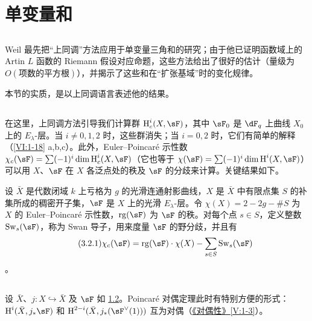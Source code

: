 \section{单变量和}\label{VI:3}

\subsection{}\label{VI:3-1}

Weil 最先把“上同调”方法应用于单变量三角和的研究；由于他已证明函数域上的 Artin $L$ 函数的 Riemann 假设对应命题，这些方法给出了很好的估计（量级为 $O(\text{项数的平方根})$），并揭示了这些和在“扩张基域”时的变化规律。

本节的实质，是以上同调语言表述他的结果。

\subsection{}\label{VI:3-2}


在这里，上同调方法引导我们计算群 $\h_c^i(X,\sF)$，其中 $\sF_0$ 是 $\dF_q$ 上曲线 $X_0$ 上的 $E_\lambda$-层。当 $i\ne 0,1,2$ 时，这些群消失；当 $i=0,2$ 时，它们有简单的解释（\ref{VI:1-18} a,b,c）。此外，Euler--Poincaré 示性数 $\chi_c(\sF) = \sum (-1)^i \dim \h_c^i(X,\sF)$（它也等于 $\chi(\sF) = \sum (-1)^i \dim \h^i(X,\sF)$）可以用 $X$、$\sF$ 在 $X$ 各泛点处的秩及 $\sF$ 的分歧来计算。关键结果如下。

设 $\bar X$ 是代数闭域 $k$ 上亏格为 $g$ 的光滑连通射影曲线，$X$ 是 $\bar X$ 中有限点集 $S$ 的补集所成的稠密开子集，$\sF$ 是 $X$ 上的光滑 $E_\lambda$-层。令 $\chi(X)=2-2 g-\# S$ 为 $X$ 的 Euler--Poincaré 示性数，$\operatorname{rg}(\sF)$ 为 $\sF$ 的秩。对每个点 $s\in S$，定义整数 $\swan_s(\sF)$，称为 Swan 导子，用来度量 $\sF$ 的野分歧，并且有
\begin{align*}\tag{3.2.1}\label{VI:eq:3-2-1}
  \chi_c(\sF) = \operatorname{rg}(\sF) \cdot \chi(X) - \sum_{s\in S} \swan_s(\sF)
\end{align*}
\cite{ra65}。

\subsection{}\label{VI:3-3}

设 $\bar X$、$j:X\hookrightarrow\bar X$ 及 $\sF$ 如 \ref{VI:3-2}。Poincaré 对偶定理此时有特别方便的形式：$\h^i(\bar X,j_\ast \sF)$ 和 $\h^{2-i}(\bar X,j_\ast(\sF^\vee(1)))$ 互为对偶（\hyperref[V]{《对偶性》}\ref{V:1-3}）。

